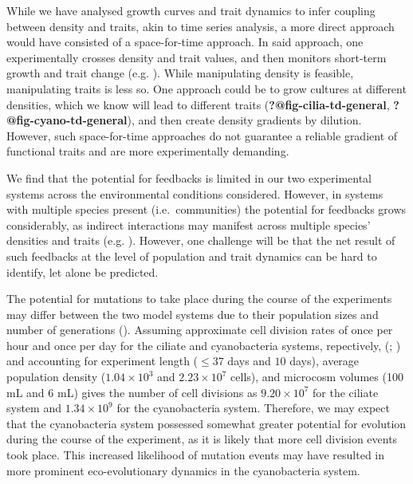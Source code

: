 \documentclass[
  letterpaper,
  DIV=11,
  numbers=noendperiod]{scrartcl}
\begin{document}
While we have analysed growth curves and trait dynamics to infer
coupling between density and traits, akin to time series analysis, a
more direct approach would have consisted of a space-for-time approach.
In said approach, one experimentally crosses density and trait values,
and then monitors short-term growth and trait change (e.g.
). While
manipulating density is feasible, manipulating traits is less so. One
approach could be to grow cultures at different densities, which we know
will lead to different traits (\textbf{?@fig-cilia-td-general},
\textbf{?@fig-cyano-td-general}), and then create density gradients by
dilution. However, such space-for-time approaches do not guarantee a
reliable gradient of functional traits and are more experimentally
demanding.

We find that the potential for feedbacks is limited in our two
experimental systems across the environmental conditions considered.
However, in systems with multiple species present (i.e.~communities) the
potential for feedbacks grows considerably, as indirect interactions may
manifest across multiple species' densities and traits (e.g.
). However, one challenge
will be that the net result of such feedbacks at the level of population
and trait dynamics can be hard to identify, let alone be predicted.

The potential for mutations to take place during the course of the
experiments may differ between the two model systems due to their
population sizes and number of generations
(). Assuming
approximate cell division rates of once per hour and once per day for
the ciliate and cyanobacteria systems, repectively,
(;
) and accounting for
experiment length (\(\leq 37\) days and \(10\) days), average population
density (\(1.04 \times 10^{3}\) and \(2.23 \times 10^{7}\) cells), and
microcosm volumes (100 mL and 6 mL) gives the number of cell divisions
as \(9.20 \times 10^{7}\) for the ciliate system and
\(1.34 \times 10^{9}\) for the cyanobacteria system. Therefore, we may
expect that the cyanobacteria system possessed somewhat greater
potential for evolution during the course of the experiment, as it is
likely that more cell division events took place. This increased
likelihood of mutation events may have resulted in more prominent
eco-evolutionary dynamics in the cyanobacteria system.
\end{document}
